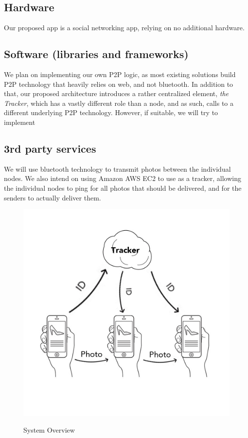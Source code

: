 \documentclass{report}
\newcommand{\lfig}[1]{\label{fig:#1}}
\begin{document}
\subsection{Hardware}
Our proposed app is a social networking app, relying on no additional hardware.

\subsection{Software (libraries and frameworks)}
We plan on implementing our own P2P logic, as most existing solutions build P2P technology that heavily relies on web, and not bluetooth. In addition to that, our proposed architecture introduces a rather centralized element, \textit{the Tracker}, which has a vastly different role than a node, and as such, calls to a different underlying P2P technology. However, if suitable, we will try to implement

\subsection{3rd party services}
We will use bluetooth technology to transmit photos between the individual nodes. We also intend on using Amazon AWS EC2 to use as a tracker, allowing the individual nodes to ping for all photos that should be delivered, and for the senders to actually deliver them.

\begin{figure}[h]
	\centering
    \includegraphics[width=\columnwidth]{overview.jpg}
    \lfig{system-overview}
    \vspace{-5mm} %
	\caption{System Overview~\cite{estimote}}
\end{figure}
\end{document}
